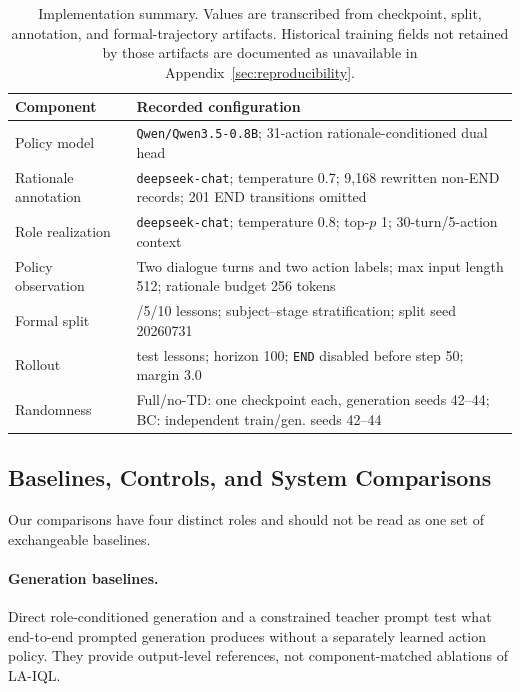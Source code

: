 \documentclass[manuscript,review,anonymous]{acmart}
\begin{document}
\begin{table}[t]
\centering
\small
\begin{tabularx}{\columnwidth}{@{}>{\raggedright\arraybackslash}p{}>{\raggedright\arraybackslash}X@{}}
\toprule
Component & Recorded configuration \\
\midrule
Policy model & \texttt{Qwen/Qwen3.5-0.8B}; 31-action rationale-conditioned dual head \\
Rationale annotation & \texttt{deepseek-chat}; temperature 0.7; 9,168 rewritten non-END records; 201 END transitions omitted \\
Role realization & \texttt{deepseek-chat}; temperature 0.8; top-$p$ 1; 30-turn/5-action context \\
Policy observation & Two dialogue turns and two action labels; max input length 512; rationale budget 256 tokens \\
Formal split & 35/5/10 lessons; subject--stage stratification; split seed 20260731 \\
Rollout & 10 test lessons; horizon 100; \texttt{END} disabled before step 50; margin 3.0 \\
Randomness & Full/no-TD: one checkpoint each, generation seeds 42--44; BC: independent train/gen. seeds 42--44 \\
\bottomrule
\end{tabularx}
\caption{Implementation summary. Values are transcribed from checkpoint,
split, annotation, and formal-trajectory artifacts. Historical training fields
not retained by those artifacts are documented as unavailable in
Appendix~\ref{sec:reproducibility}.}
\label{tab:implementation-summary}
\end{table}

\subsection{Baselines, Controls, and System Comparisons}
\label{sec:comparison-roles}

Our comparisons have four distinct roles and should not be read as one set of
exchangeable baselines.

\paragraph{Generation baselines.}
Direct role-conditioned generation and a constrained teacher prompt test what
end-to-end prompted generation produces without a separately learned action
policy. They provide output-level references, not component-matched ablations
of LA-IQL.
\end{document}
